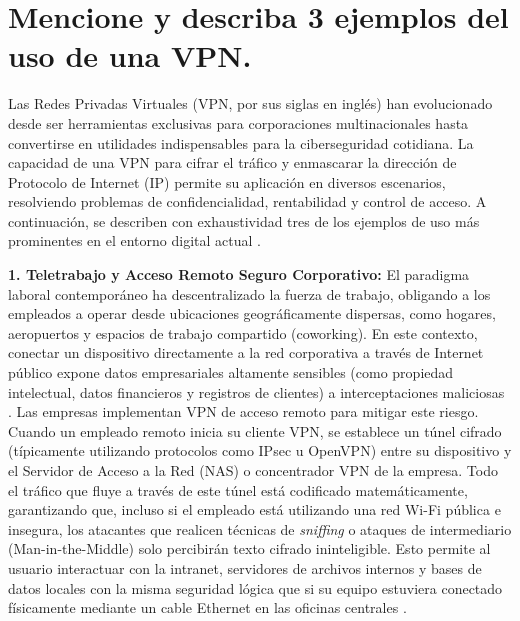 \documentclass[a4paper,12pt]{article}
\begin{document}
\renewcommand{\footrulewidth}{0.4pt}  %

\setcounter{page}{1}

\tableofcontents

\newpage

\section{Mencione y describa 3 ejemplos del uso de una VPN.}

Las Redes Privadas Virtuales (VPN, por sus siglas en inglés) han evolucionado desde ser herramientas exclusivas para corporaciones multinacionales hasta convertirse en utilidades indispensables para la ciberseguridad cotidiana. La capacidad de una VPN para cifrar el tráfico y enmascarar la dirección de Protocolo de Internet (IP) permite su aplicación en diversos escenarios, resolviendo problemas de confidencialidad, rentabilidad y control de acceso. A continuación, se describen con exhaustividad tres de los ejemplos de uso más prominentes en el entorno digital actual \cite{aws_vpn, paloalto_vpn_business}.

\textbf{1. Teletrabajo y Acceso Remoto Seguro Corporativo:}
El paradigma laboral contemporáneo ha descentralizado la fuerza de trabajo, obligando a los empleados a operar desde ubicaciones geográficamente dispersas, como hogares, aeropuertos y espacios de trabajo compartido (coworking). En este contexto, conectar un dispositivo directamente a la red corporativa a través de Internet público expone datos empresariales altamente sensibles (como propiedad intelectual, datos financieros y registros de clientes) a interceptaciones maliciosas \cite{trendmicro_vpn}. Las empresas implementan VPN de acceso remoto para mitigar este riesgo. Cuando un empleado remoto inicia su cliente VPN, se establece un túnel cifrado (típicamente utilizando protocolos como IPsec u OpenVPN) entre su dispositivo y el Servidor de Acceso a la Red (NAS) o concentrador VPN de la empresa. Todo el tráfico que fluye a través de este túnel está codificado matemáticamente, garantizando que, incluso si el empleado está utilizando una red Wi-Fi pública e insegura, los atacantes que realicen técnicas de \textit{sniffing} o ataques de intermediario (Man-in-the-Middle) solo percibirán texto cifrado ininteligible. Esto permite al usuario interactuar con la intranet, servidores de archivos internos y bases de datos locales con la misma seguridad lógica que si su equipo estuviera conectado físicamente mediante un cable Ethernet en las oficinas centrales \cite{cloudflare_business}.
\end{document}
